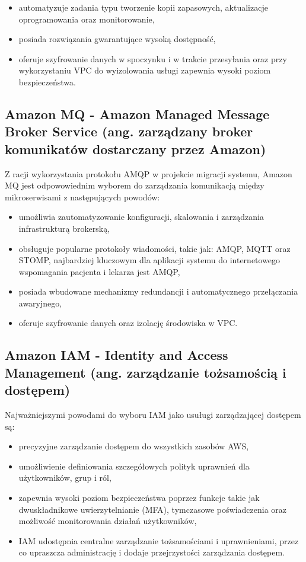\documentclass[12pt,oneside]{book}
\begin{document}
    \begin{itemize}
        \item automatyzuje zadania typu tworzenie kopii zapasowych, aktualizacje oprogramowania oraz monitorowanie,
        \item posiada rozwiązania gwarantujące wysoką dostępność,
        \item oferuje szyfrowanie danych w spoczynku i w trakcie przesyłania oraz przy wykorzystaniu VPC do wyizolowania usługi zapewnia wysoki poziom bezpieczeństwa. \cite{aws.rds}
    \end{itemize}

    \subsection{Amazon MQ - Amazon Managed Message Broker Service  (ang. zarządzany broker komunikatów dostarczany przez Amazon)}
    Z racji wykorzystania protokołu AMQP w projekcie migracji systemu, Amazon MQ jest odpowowiednim wyborem do zarządzania komunikacją między mikroserwisami z następujących powodów:

    \begin{itemize}
        \item umożliwia zautomatyzowanie konfiguracji, skalowania i zarządzania infrastrukturą brokerską,
        \item obsługuje popularne protokoły wiadomości, takie jak: AMQP, MQTT oraz STOMP, najbardziej kluczowym dla aplikacji systemu do internetowego wspomagania pacjenta i lekarza jest AMQP,
        \item posiada wbudowane mechanizmy redundancji i automatycznego przełączania awaryjnego,
        \item oferuje szyfrowanie danych oraz izolację środowiska w VPC. \cite{aws.mq}
    \end{itemize}

    \subsection{Amazon IAM - Identity and Access Management (ang. zarządzanie tożsamością i dostępem)}
    Najważniejszymi powodami do wyboru IAM jako usuługi zarządzającej dostępem są:

    \begin{itemize}
        \item precyzyjne zarządzanie dostępem do wszystkich zasobów AWS,
        \item umożliwienie definiowania szczegółowych polityk uprawnień dla użytkowników, grup i ról,
        \item zapewnia wysoki poziom bezpieczeństwa poprzez funkcje takie jak dwuskładnikowe uwierzytelnianie (MFA), tymczasowe poświadczenia oraz możliwość monitorowania działań użytkowników,
        \item IAM udostępnia centralne zarządzanie tożsamościami i uprawnieniami, przez co upraszcza administrację i dodaje przejrzystości zarządzania dostępem. \cite{aws.iam}
    \end{itemize}
\end{document}
